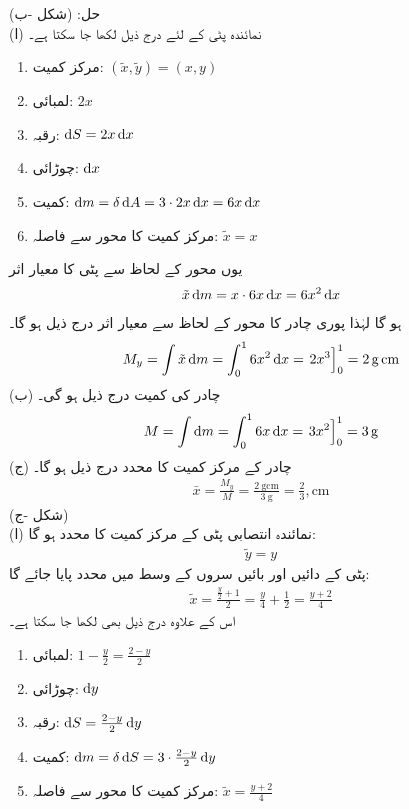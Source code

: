 حل:\quad
{}  (شکل -ب)\\
(ا) نمائندہ پٹی کے لئے درج ذیل لکھا جا سکتا ہے۔
\begin{multicols}{2}
\begin{enumerate}[]
\item
مرکز کمیت:\quad
    $(\tilde{x},\tilde{y})=(x,y)$
\item
لمبائی:\quad
$2x$
\item
رقبہ:\quad
$\dif S=2x\dif x$
\item
چوڑائی:\quad
$\dif x$
\item
کمیت:\quad
$\dif m=\delta \dif A=3\cdot2x\dif x=6x\dif x$\\
\item
مرکز کمیت کا محور  سے فاصلہ:\quad
$\tilde{x}=x$
\end{enumerate}
\end{multicols}
یوں محور  کے لحاظ سے پٹی کا معیار اثر
\begin{align*}
\tilde{x}\dif m=x\cdot 6x\dif x=6x^2\dif x
\end{align*}
ہو گا لہٰذا پوری چادر کا محور  کے لحاظ سے معیار اثر درج ذیل ہو گا۔
\begin{align*}
M_y=\int\tilde{x}\dif m=\int_0^1 6x^2\dif x=\left.2x^3\right]_0^1=\SI{2}{\gram\centi\meter}
\end{align*}
(ب) چادر کی کمیت درج ذیل ہو گی۔
\begin{align*}
M=\int \dif m=\int_0^16x\dif x=\left.3x^2\right]_0^1=\SI{3}{\gram}
\end{align*}
(ج) چادر کے مرکز کمیت کا  محدد درج ذیل ہو گا۔
\begin{align*}
\bar{x}=\frac{M_y}{M}=\frac{\SI{2}{\gram\centi\meter}}{\SI{3}{\gram}}=\frac{2}{3},\si{\centi\meter}
\end{align*}
   (شکل -ج)\\
(ا) نمائندہ انتصابی پٹی کے مرکز کمیت کا  محدد  ہو گا:
\begin{align*}
\tilde{y}=y
\end{align*}
پٹی کے دائیں اور بائیں سروں کے وسط میں  محدد پایا جائے گا:
\begin{align*}
\tilde{x}=\frac{\frac{y}{2}+1}{2}=\frac{y}{4}+\frac{1}{2}=\frac{y+2}{4}
\end{align*}
اس کے علاوہ درج ذیل بھی لکھا جا سکتا ہے۔
\begin{multicols}{2}
\begin{enumerate}[]
\item
لمبائی:\quad
$1-\frac{y}{2}=\frac{2-y}{2}$
\item
چوڑائی:\quad
$\dif y$
\item
رقبہ:\quad
$\dif S=\frac{2-y}{2}\dif y$
\item
کمیت:\quad
$\dif m=\delta \dif S=3\cdot\frac{2-y}{2}\dif y$
\item
مرکز کمیت کا محور  سے فاصلہ:\quad
$\tilde{x}=\frac{y+2}{4}$
\end{enumerate}
\end{multicols}

